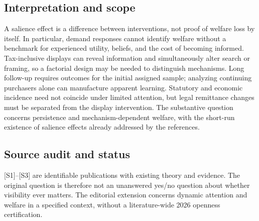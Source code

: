 \documentclass[11pt,a4paper]{article}
\begin{document}
\subsection*{Interpretation and scope}
A salience effect is a difference between interventions, not proof of welfare loss by itself. In particular, demand responses cannot identify welfare without a benchmark for experienced utility, beliefs, and the cost of becoming informed. Tax-inclusive displays can reveal information and simultaneously alter search or framing, so a factorial design may be needed to distinguish mechanisms. Long follow-up requires outcomes for the initial assigned sample; analyzing continuing purchasers alone can manufacture apparent learning. Statutory and economic incidence need not coincide under limited attention, but legal remittance changes must be separated from the display intervention. The substantive question concerns persistence and mechanism-dependent welfare, with the short-run existence of salience effects already addressed by the references.

\subsection*{Source audit and status}
[S1]--[S3] are identifiable publications with existing theory and evidence. The original question is therefore not an unanswered yes/no question about whether visibility ever matters. The editorial extension concerns dynamic attention and welfare in a specified context, without a literature-wide 2026 openness certification.
\end{document}
